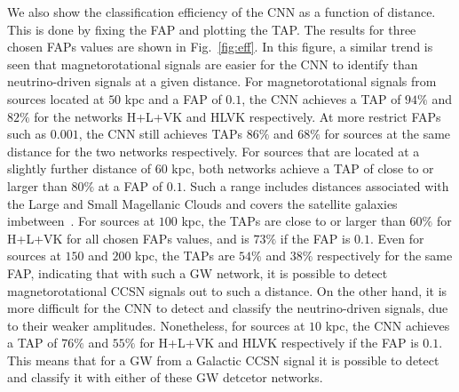 \documentclass[aps,twocolumn,showpacs,groupedaddress, nofootinbib]{revtex4}  %
\begin{document}
%
%
We also show the classification efficiency of the \ac{CNN}  as a function of
distance.  This is done by fixing the \ac{FAP} and plotting the \ac{TAP}.  The
results for three chosen \acp{FAP} values are shown in Fig.~\ref{fig:eff}.  In
this figure, a similar trend is seen that magnetorotational signals are easier
for the \ac{CNN} to identify than neutrino-driven signals at a given distance.
For magnetorotational signals from sources located at $50$ kpc and a \ac{FAP}
of $0.1$, the \ac{CNN} achieves a \ac{TAP} of $94\%$ and $82\%$ for the
networks H+L+VK and HLVK respectively. At more restrict \acp{FAP} such as
$0.001$, the \ac{CNN} still achieves \acp{TAP} $86\%$ and $68\%$ for sources at
the same distance for the two networks respectively.  For sources that are
located at a slightly further distance of $60$ kpc, both networks achieve a
\ac{TAP} of close to or larger than $80\%$ at a \ac{FAP} of $0.1$. Such a range
includes distances associated with the Large and Small Magellanic Clouds and
covers the satellite galaxies imbetween~\cite{karachentsev2004catalog,
belokurov2007cats}.  For sources at $100$ kpc, the \acp{TAP} are close to or
larger than $60\%$ for H+L+VK for all chosen \acp{FAP} values, and is $73\%$ if
the \ac{FAP} is $0.1$. Even for sources at $150$ and $200$ kpc, the \acp{TAP}
are $54\%$ and $38\%$ respectively for the same \ac{FAP}, indicating that with
such a \ac{GW} network, it is possible to detect magnetorotational \ac{CCSN}
signals out to such a distance. On the other hand, it is more difficult for the
\ac{CNN} to detect and classify the neutrino-driven signals, due to their
weaker amplitudes. Nonetheless, for sources at $10$ kpc, the \ac{CNN} achieves
a \ac{TAP} of $76\%$ and $55\%$ for H+L+VK and HLVK respectively if the
\ac{FAP} is $0.1$.  This means that for a \ac{GW} from a Galactic \ac{CCSN}
signal it is possible to detect and classify it with either of these \ac{GW}
detcetor networks.
\end{document}
